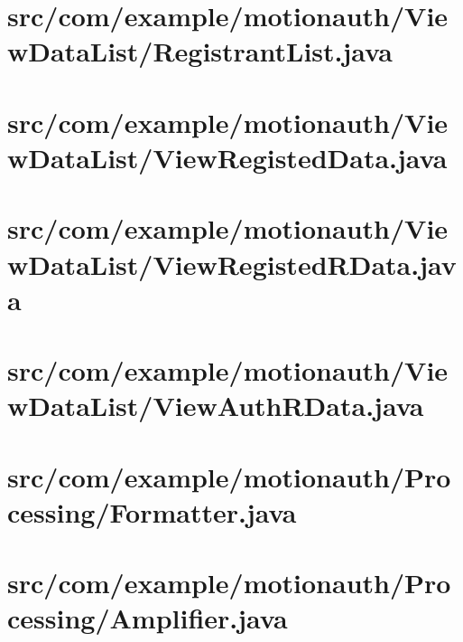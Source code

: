 \documentclass[12pt]{jreport}
\renewcommand{\slash}{/}
\begin{document}
    \section{src\slash com\slash example\slash motionauth\slash ViewDataList\slash RegistrantList.java}
    

    \section{src\slash com\slash example\slash motionauth\slash ViewDataList\slash ViewRegistedData.java}
    

    \section{src\slash com\slash example\slash motionauth\slash ViewDataList\slash ViewRegistedRData.java}
    

    \section{src\slash com\slash example\slash motionauth\slash ViewDataList\slash ViewAuthRData.java}
    

    \section{src\slash com\slash example\slash motionauth\slash Processing\slash Formatter.java}
    

    \section{src\slash com\slash example\slash motionauth\slash Processing\slash Amplifier.java}
    
\end{document}
